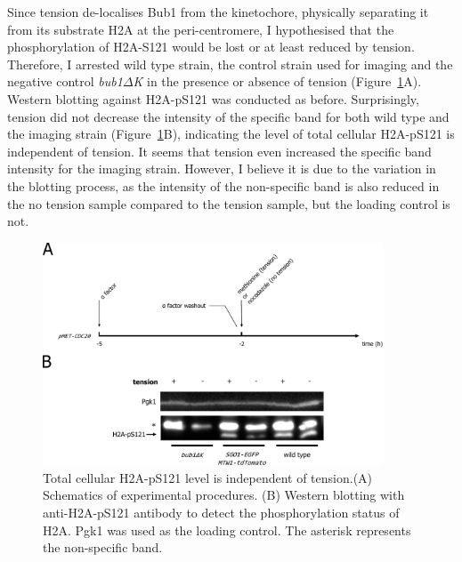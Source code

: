 Since tension de-localises Bub1 from the kinetochore, physically separating it from its substrate H2A at the peri-centromere, I hypothesised that the phosphorylation of H2A-S121 would be lost or at least reduced by tension. Therefore, I arrested wild type strain, the control strain used for imaging and the negative control \textit{bub1$\Delta$K} in the presence or absence of tension (Figure~\ref{fig:ph2atension}A). Western blotting against H2A-pS121 was conducted as before. Surprisingly, tension did not decrease the intensity of the specific band for both wild type and the imaging strain (Figure~\ref{fig:ph2atension}B), indicating the level of total cellular H2A-pS121 is independent of tension. It seems that tension even increased the specific band intensity for the imaging strain. However, I believe it is due to the variation in the blotting process, as the intensity of the non-specific band is also reduced in the no tension sample compared to the tension sample, but the loading control is not. 

\begin{figure}[htbp]
  \centering
  \includegraphics[width=0.9\textwidth]{chapter3/figures/pH2A tension.pdf}
  \caption[Total cellular H2A-pS121 level is independent of tension]{Total cellular H2A-pS121 level is independent of tension.(A) Schematics of experimental procedures. (B) Western blotting with anti-H2A-pS121 antibody to detect the phosphorylation status of H2A. Pgk1 was used as the loading control. The asterisk represents the non-specific band.}
  \label{fig:ph2atension}
\end{figure}

